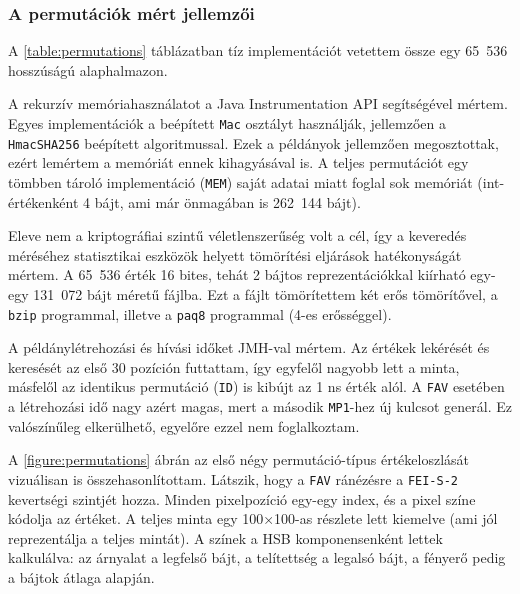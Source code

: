 \documentclass[
    parspace,
    noindent,
    nohyp,
]{elteiktdk}[2023/04/10]
\begin{document}
\subsubsection{A permutációk mért jellemzői}

A \ref{table:permutations} táblázatban tíz implementációt vetettem össze
egy 65~536 hosszúságú alaphalmazon.

A rekurzív memóriahasználatot a Java Instrumentation API segítségével mértem.
Egyes implementációk a beépített \texttt{Mac} osztályt használják,
jellemzően a \texttt{HmacSHA256} beépített algoritmussal.
Ezek a példányok jellemzően megosztottak,
ezért lemértem a memóriát ennek kihagyásával is.
A teljes permutációt egy tömbben tároló implementáció (\texttt{MEM})
saját adatai miatt foglal sok memóriát
(int-értékenként 4 bájt, ami már önmagában is 262~144 bájt).

Eleve nem a kriptográfiai szintű véletlenszerűség volt a cél,
így a keveredés méréséhez statisztikai eszközök helyett
tömörítési eljárások hatékonyságát mértem.
A 65~536 érték 16 bites, tehát 2 bájtos reprezentációkkal
 kiírható egy-egy 131~072 bájt méretű fájlba.
Ezt a fájlt tömörítettem két erős tömörítővel,
a \texttt{bzip} programmal, illetve a \texttt{paq8} programmal (4-es erősséggel).

A példánylétrehozási és hívási időket JMH-val mértem.
Az értékek lekérését és keresését az első 30 pozíción futtattam,
így egyfelől nagyobb lett a minta,
másfelől az identikus permutáció (\texttt{ID}) is kibújt az 1 ns érték alól.
A \texttt{FAV} esetében a létrehozási idő nagy azért magas,
mert a második \texttt{MP1}-hez új kulcsot generál.
Ez valószínűleg elkerülhető, egyelőre ezzel nem foglalkoztam.

A \ref{figure:permutations} ábrán az első négy permutáció-típus értékeloszlását
vizuálisan is összehasonlítottam.
Látszik, hogy a \texttt{FAV} ránézésre a \texttt{FEI-S-2} kevertségi szintjét hozza.
Minden pixelpozíció egy-egy index, és a pixel színe kódolja az értéket.
A teljes minta egy 100×100-as részlete lett kiemelve (ami jól reprezentálja a teljes mintát).
A színek a HSB komponensenként lettek kalkulálva:
az árnyalat a legfelső bájt, a telítettség a legalsó bájt,
a fényerő pedig a bájtok átlaga alapján.
\end{document}
